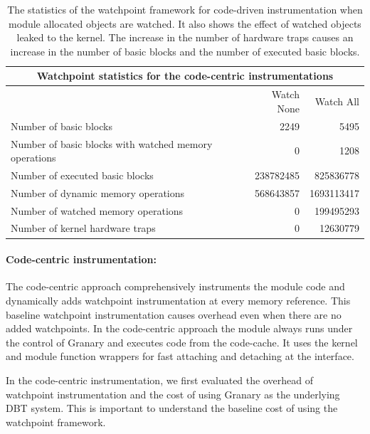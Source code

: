 \begin{table}
\begin{center}
\vspace{1em}
\begin{tabular}{|l|r|r|}
  \hline
  \multicolumn{3}{|c|}{Watchpoint statistics for the code-centric instrumentations}  \\ \hline
  \hline
  & Watch None & Watch All \\
  \hline
  Number of basic blocks & 2249 & 5495\\
  \hline
  Number of basic blocks with watched memory operations & 0 & 1208\\
  \hline
  Number of executed basic blocks & 238782485 &  825836778 \\
  \hline
  Number of dynamic memory operations & 568643857 & 1693113417 \\
  \hline
  Number of watched memory operations & 0 &199495293 \\
  \hline
  Number of kernel hardware traps & 0 & 12630779 \\
  \hline
\end{tabular}
\caption[Watchpoint statistics for code centric instrumentation. The watchpoints are added on all module allocated objects.]{\label{table:code-centric-watchpoint_stats} The statistics of the watchpoint framework for code-driven instrumentation when module allocated objects are watched. It also shows the effect of watched objects leaked to the kernel. The increase in the number of hardware traps causes an increase in the number of basic blocks and the number of executed basic blocks.}
\end{center}
\end{table}

\paragraph{Code-centric instrumentation:}
The code-centric approach comprehensively instruments the module code and dynamically adds watchpoint instrumentation at every memory reference. This baseline watchpoint instrumentation causes overhead even when there are no added watchpoints. In the code-centric approach the module always runs under the control of Granary and executes code from the code-cache. It uses the kernel and module function wrappers for fast attaching and detaching at the interface. %

In the code-centric instrumentation, we first evaluated the overhead of watchpoint instrumentation and the cost of using Granary as the underlying DBT system. This is important to understand the baseline cost of using the watchpoint framework. 

